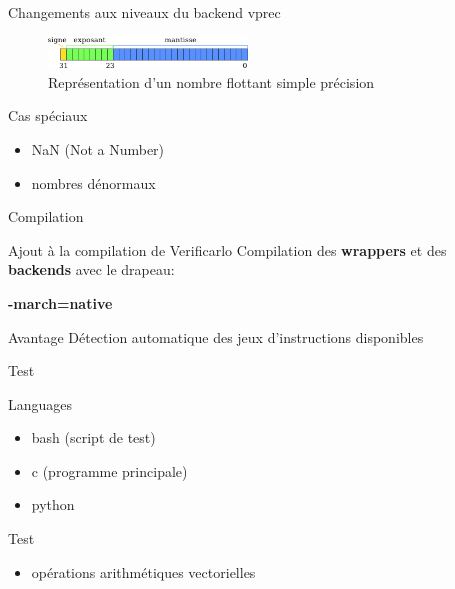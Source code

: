 \documentclass{beamer}
\begin{document}
\begin{frame}{Changements aux niveaux du backend vprec}

  \begin{figure}
    \centering
    \includegraphics[width=200px]{../ressources/IEEE754_simple_precision.png}
    \caption{\label{fig:ieee_simple_precision}Représentation d'un nombre flottant simple précision}
  \end{figure}

  \begin{block}{Cas spéciaux}
    \begin{itemize}
    \item NaN (Not a Number)
    \item nombres dénormaux
    \end{itemize}
  \end{block}

\end{frame}

\begin{frame}{Compilation}

  \begin{block}{Ajout à la compilation de Verificarlo}
    Compilation des \textbf{wrappers} et des \textbf{backends} avec le drapeau:
    \begin{center}
      \textbf{-march=native}
    \end{center}
  \end{block}

  \begin{block}{Avantage}
    Détection automatique des jeux d'instructions disponibles
  \end{block}


\end{frame}

\begin{frame}{Test}

  \begin{block}{Languages}
    \begin{itemize}
    \item bash (script de test)
    \item c (programme principale)
    \item python
    \end{itemize}
  \end{block}

  \begin{block}{Test}
    \begin{itemize}
    \item opérations arithmétiques vectorielles
    \end{itemize}
  \end{block}

\end{frame}
\end{document}
